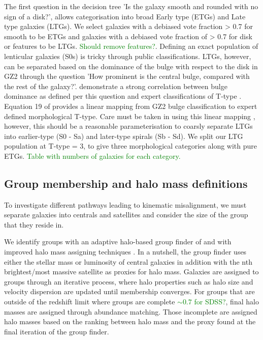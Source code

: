 \documentclass[fleqn,usenatbib]{mnras}
\newcommand{\green}[1]{{\textcolor{green}{#1}}}
\begin{document}
The first question in the decision tree 'Is the galaxy smooth and rounded with no sign of a disk?', allows categorisation into broad Early type (ETGs) and Late type galaxies (LTGs). We select galaxies with a debiased vote fraction > 0.7 for smooth to be ETGs and galaxies with a debiased vote fraction of > 0.7 for disk or features to be LTGs. \green{Should remove features?}. Defining an exact population of lenticular galaxies (S0s) is tricky through public classifications. LTGs, however, can be separated based on the dominance of the bulge with respect to the disk in GZ2 through the question 'How prominent is the central bulge, compared with the rest of the galaxy?'. \citep{willett2013} demonstrate a strong correlation between bulge dominance as defined per this question and expert classifications of T-type \citep{nair2010}. Equation 19 of \citet{willett2013} provides a linear mapping from GZ2 bulge classification to expert defined morphological T-type. Care must be taken in using this linear mapping \citep[see discussion in][]{willett2013}, however, this should be a reasonable parameterisation to coarsly separate LTGs into earlier-type (S0 - Sa) and later-type spirals (Sb - Sd). We split our LTG population at T-type = 3, to give three morphological categories along with pure ETGs. \green{Table with numbers of galaxies for each category.}

\subsection{Group membership and halo mass definitions} \label{sec:group_def}
To investigate different pathways leading to kinematic misalignment, we must separate galaxies into centrals and satellites and consider the size of the group that they reside in. 

We identify groups with an adaptive halo-based group finder of \citet{yang2005,yang2007} and with improved halo mass assigning techniques \citep[see;][for details and application to SDSS]{lim2017}. In a nutshell, the group finder uses either the stellar mass or luminosity of central galaxies in addition with the nth brightest/most massive satellite as proxies for halo mass. Galaxies are assigned to groups through an iterative process, where halo properties such as halo size and velocity dispersion are updated until membership converges. For groups that are outside of the redshift limit where groups are complete \green{$\sim 0.7$ for SDSS?}, final halo masses are assigned through abundance matching. Those incomplete are assigned halo masses based on the ranking between halo mass and the proxy found at the final iteration of the group finder.
\end{document}
